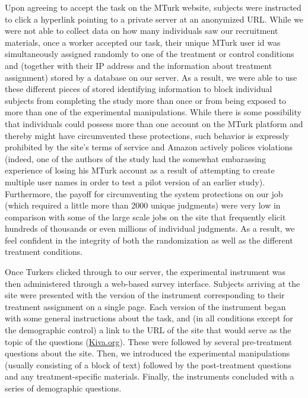 \documentclass{chi2009}
\begin{document}
Upon agreeing to accept the task on the MTurk website, subjects were
instructed to click a hyperlink pointing to a private server at an
anonymized URL. While we were not able to collect data on how many
individuals saw our recruitment materials, once a worker accepted our
task, their unique MTurk user id was simultaneously assigned randomly
to one of the treatment or control conditions and (together with their
IP address and the information about treatment assignment) stored by a
database on our server. As a result, we were able to use these
different pieces of stored identifying information to block individual
subjects from completing the study more than once or from being
exposed to more than one of the experimental manipulations. While
there is some possibility that individuals could possess more than one
account on the MTurk platform and thereby might have circumvented
these protections, such behavior is expressly prohibited by the site's
terms of service and Amazon actively polices violations (indeed, one
of the authors of the study had the somewhat embarassing experience of
losing his MTurk account as a result of attempting to create multiple
user names in order to test a pilot version of an earlier
study). Furthermore, the payoff for circumventing the system
protections on our job (which required a little more than 2000 unique
judgments) were very low in comparison with some of the large scale
jobs on the site that frequently elicit hundreds of thousands or even
millions of individual judgments. As a result, we feel confident in
the integrity of both the randomization as well as the different
treatment conditions.

Once Turkers clicked through to our server, the experimental
instrument was then administered through a web-based survey
interface. Subjects arriving at the site were presented with the
version of the instrument corresponding to their treatment assignment
on a single page. Each version of the instrument began with some
general instructions about the task, and (in all conditions except for
the demographic control) a link to the URL of the site that would
serve as the topic of the questions
(\href{http://www.kiva.org}{Kiva.org}). These were followed by several
pre-treatment questions about the site. Then, we introduced the
experimental manipulations (usually consisting of a block of text)
followed by the post-treatment questions and any treatment-specific
materials. Finally, the instruments concluded with a series of
demographic questions.
\end{document}
